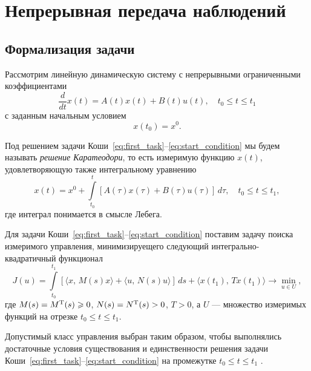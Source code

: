 \section{Непрерывная передача наблюдений}
\subsection{Формализация задачи}

Рассмотрим линейную динамическую систему с непрерывными ограниченными коэффициентами
\begin{equation}\label{eq:first_task}
        \frac{d}{dt}x(t) = A(t)x(t) + B(t)u(t),
        \quad
        t_0 \leqslant t \leqslant t_1
\end{equation}
с заданным начальным условием
\begin{equation}\label{eq:start_condition}
        x(t_0) = x^0.
\end{equation}
\begin{remark}
        Под решением задачи Коши~\eqref{eq:first_task}--\eqref{eq:start_condition} мы будем называть \textit{решение Каратеодори}, то есть измеримую функцию $x(t)$, удовлетворяющую также интегральному уравнению
$$
        x(t) = x^0 + \int\limits_{t_0}^{t} [A(\tau)x(\tau) + B(\tau)u(\tau)]\,d\tau,
        \quad
        t_0\leqslant t \leqslant t_1,
$$ 
        где интеграл понимается в смысле Лебега.
\end{remark}

Для задачи Коши~\eqref{eq:first_task}--\eqref{eq:start_condition} поставим задачу поиска измеримого управления, минимизируещего следующий интегрально-квадратичный функционал
\begin{equation}\label{eq:functional}
        J(u)
=
        \int\limits_{t_0}^{t_1}
[
\langle
x,\,M(s)x
\rangle
+
\langle
u,\,N(s)u
\rangle
]\,ds
        +
        \langle
        x(t_1),\,Tx(t_1)
        \rangle
\to
        \min\limits_{u \in U},
\end{equation}
где $M(s) = M^\mathrm{T}(s) \geqslant 0$,
$N(s) = N^\mathrm{T}(s) > 0$,
$T > 0$,
а $U$ --- множество измеримых функций на отрезке $t_0 \leqslant t \leqslant t_1$.

\begin{remark}
        Допустимый класс управления выбран таким образом, чтобы выполнялись достаточные условия существования и единственности решения задачи Коши~\eqref{eq:first_task}--\eqref{eq:start_condition} на промежутке $t_0 \leqslant t \leqslant t_1$ \cite{filippov}.
\end{remark}


